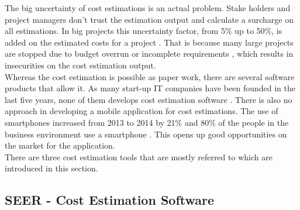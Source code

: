 The big uncertainty of cost estimations is an actual problem. Stake holders and project managers don't trust the estimation output and calculate a surcharge on all estimations. In big projects this uncertainty factor, from 5\% up to 50\%, is added on the estimated costs for a project \cite{fischer}. That is because many large projects are stopped due to budget overrun or incomplete requirements \cite{chaos}, which results in insecurities on the cost estimation output.\\  
Whereas the cost estimation is possible as paper work, there are several software products that allow it. As many start-up IT companies have been founded in the last five years, none of them develops cost estimation software \cite{dsm}. There is also no approach in developing a mobile application for cost estimations. The use of smartphones increased from 2013 to 2014 by 21\% and 80\% of the people in the business environment use a smartphone \cite{faszinationmobile}. This opens up good opportunities on the market for the application.\\
There are three cost estimation tools that are mostly referred to which are introduced in this section.\\

\subsection{SEER - Cost Estimation Software}

